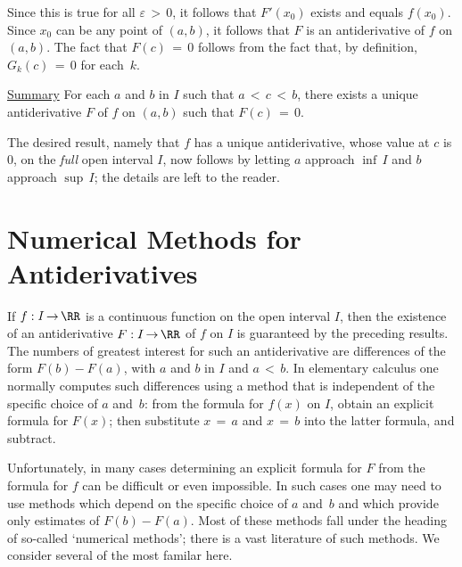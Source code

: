 {    Since this is true for all ${\varepsilon}\,>\,0$, it follows that $F'(x_{0})$ exists and equals $f(x_{0})$.
    Since $x_{0}$ can be any point of $(a,b)$, it follows that $F$ is an antiderivative of $f$ on $(a,b)$.
    The fact that $F(c) \,=\, 0$ follows from the fact that, by definition, $G_{k}(c) \,=\, 0$ for each~$k$.

\V

        \underline{Summary} For each $a$ and $b$ in $I$ such that $a\,<\,c\,<\,b$,
    there exists a unique antiderivative $F$ of $f$ on $(a,b)$ such that $F(c) \,=\, 0$.

        The desired result, namely that $f$ has a unique antiderivative, whose value at $c$ is $0$, on the {\em full} open interval $I$,
    now follows by letting $a$ approach ${\inf}\,I$ and $b$ approach ${\sup}\,I$; the details are left to the reader. \Q

\VV

                \section{{\bf Numerical Methods for Antiderivatives}} 
                \label{SectE45C}


\VV

        If $f:I \,{\rightarrow}\, {\RR}$ is a continuous function on the open interval $I$,
    then the existence of an antiderivative $F:I \,{\rightarrow}\, {\RR}$ of $f$ on $I$ is guaranteed by the preceding results.
    The numbers of greatest interest for such an antiderivative are differences of the form $F(b) - F(a)$, with $a$ and $b$ in $I$ and $a\,<\,b$.
    In elementary calculus one normally computes such differences using a method that is independent of the specific choice of $a$ and~$b$:
    from the formula for $f(x)$ on $I$, obtain an explicit formula for $F(x)$; then substitute $x \,=\, a$ and $x \,=\, b$ into the latter formula, and subtract.

        Unfortunately, in many cases determining an explicit formula for $F$ from the formula for $f$ can be difficult or even impossible.
    In such cases one may need to use methods which depend on the specific choice of $a$ and~$b$ and which provide only estimates of $F(b)-F(a)$.
    Most of these methods fall under the heading of so-called `numerical methods'; there is a vast literature of such methods.
    We consider several of the most familar here.

}
